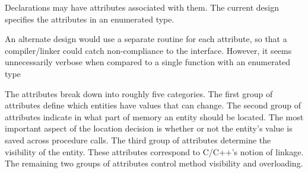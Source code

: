 \begin{functionality}
\end{functionality}

\begin{functionality}
\end{functionality}





Declarations may have attributes associated with them.  The
current design specifies the attributes in an enumerated type.  

An alternate design would use a separate routine for each attribute, so
that a compiler/linker could catch non-compliance to the interface.
However, it seems unnecessarily verbose when compared to a single
function with an enumerated type

The attributes break down into roughly five categories.  The first
group of attributes define which entities have values that can change.
The second group of attributes indicate in what part of memory an
entity should be located.  The most important aspect of the location
decision is whether or not the entity's value is saved across
procedure calls.  The third group of attributes determine the
visibility of the entity.  These attributes correspond to C/C++'s
notion of linkage.  The remaining two groups of attributes control
method visibility and overloading.

